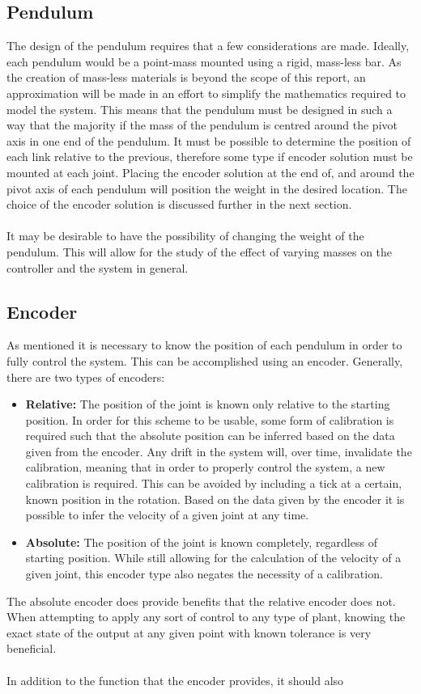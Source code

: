 \subsection{Pendulum} %
\label{sub:pendulum}
The design of the pendulum requires that a few considerations are made.
Ideally, each pendulum would be a point-mass mounted using a rigid, mass-less bar.
As the creation of mass-less materials is beyond the scope of this report, an approximation will be made in an effort to simplify the mathematics required to model the system.
This means that the pendulum must be designed in such a way that the majority if the mass of the pendulum is centred around the pivot axis in one end of the pendulum.
It must be possible to determine the position of each link relative to the previous, therefore some type if encoder solution must be mounted at each joint.
Placing the encoder solution at the end of, and around the pivot axis of each pendulum will position the weight in the desired location.
The choice of the encoder solution is discussed further in the next section.
\\~\\
It may be desirable to have the possibility of changing the weight of the pendulum.
This will allow for the study of the effect of varying masses on the controller and the system in general.

\subsection{Encoder} %
\label{sub:encoder}
As mentioned it is necessary to know the position of each pendulum in order to fully control the system.
This can be accomplished using an encoder.
Generally, there are two types of encoders:
\begin{itemize}
	\item \textbf{Relative:} The position of the joint is known only relative to the starting position.
	In order for this scheme to be usable, some form of calibration is required such that the absolute position can be inferred based on the data given from the encoder.
	Any drift in the system will, over time, invalidate the calibration, meaning that in order to properly control the system, a new calibration is required.
	This can be avoided by including a tick at a certain, known position in the rotation.
	Based on the data given by the encoder it is possible to infer the velocity of a given joint at any time.
	\item \textbf{Absolute:} The position of the joint is known completely, regardless of starting position.
	While still allowing for the calculation of the velocity of a given joint, this encoder type also negates the necessity of a calibration.
\end{itemize}
The absolute encoder does provide benefits that the relative encoder does not.
When attempting to apply any sort of control to any type of plant, knowing the exact state of the output at any given point with known tolerance is very beneficial.
\\~\\
In addition to the function that the encoder provides, it should also  
